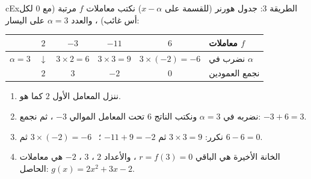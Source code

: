 \documentclass[12pt,a4paper]{article}
\newenvironment{LTR}{\begin{otherlanguage}{english}}{\end{otherlanguage}}
\newcommand{\ar}[1]{\foreignlanguage{arabic}{#1}}
\begin{document}
\begin{otherlanguage}{english}\begin{arbox}[breakable]{cEx}{الطريقة 3: جدول هورنر (للقسمة على $x-\alpha$)}
نكتب معاملات $f$ مرتبة (مع $0$ لكل أس غائب) ، والعدد $\alpha=3$ على اليسار:
\begin{center}
\begin{LTR}
\renewcommand{\arraystretch}{1.6}
\begin{tabular}{|c|c|c|c|c|l|}\hline
\cellcolor{cDef!15} & \cellcolor{cDef!15}$2$ & \cellcolor{cDef!15}$-3$ & \cellcolor{cDef!15}$-11$ & \cellcolor{cDef!15}$6$ & \ar{معاملات $f$}\\\hline
\cellcolor{cEx!25}$\alpha=3$ & $\downarrow$ & $3\times2=6$ & $3\times3=9$ & $3\times(-2)=-6$ & \ar{نضرب في $\alpha$}\\\hline
 & \cellcolor{cSol!15}$2$ & \cellcolor{cSol!15}$3$ & \cellcolor{cSol!15}$-2$ & \cellcolor{cThm!20}$0$ & \ar{نجمع العمودين}\\\hline
\end{tabular}
\end{LTR}
\end{center}
\begin{enumerate}
\item ننزل المعامل الأول $2$ كما هو.
\item نضربه في $\alpha=3$ ونكتب الناتج $6$ تحت المعامل الموالي $-3$ ، ثم نجمع: $-3+6=3$.
\item نكرر: $3\times3=9$ ثم $-11+9=-2$ ؛ \ $3\times(-2)=-6$ ثم $6-6=0$.
\item الخانة الأخيرة هي الباقي $r=f(3)=0$ ، والأعداد $2$ ، $3$ ، $-2$ هي معاملات الحاصل: $g(x)=2x^2+3x-2$.
\end{enumerate}
\end{arbox}\end{otherlanguage}
\end{document}
